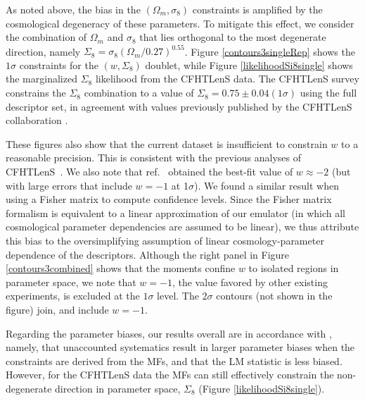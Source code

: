 \documentclass[reprint,aps,prd,superscriptaddress,showkeys,showpacs]{revtex4-1}
\begin{document}
As noted above, the bias in the $(\Omega_m,\sigma_8)$ constraints is
amplified by the cosmological degeneracy of these parameters. To
mitigate this effect, we consider the combination of $\Omega_m$ and
$\sigma_8$ that lies orthogonal to the most degenerate direction,
namely $\Sigma_8=\sigma_8(\Omega_m/0.27)^{0.55}$. Figure
\ref{contours3singleRep} shows the $1\sigma$ constraints for the
$(w,\Sigma_8)$ doublet, while Figure \ref{likelihoodSi8single} shows
the marginalized $\Sigma_8$ likelihood from the CFHTLenS data. The
CFHTLenS survey constrains the $\Sigma_8$ combination to a value of
$\Sigma_8=0.75\pm0.04(1\sigma)$ using the full descriptor set, in
agreement with values previously published by the CFHTLenS
collaboration \citep{CFHTKilbinger}. 

These figures also show that the current dataset is insufficient to
constrain $w$ to a reasonable precision.
This is consistent with the previous analyses of
CFHTLenS~\citep{CFHTKilbinger,CFHTFu,Companion,CFHTMasato}.  We also
note that ref.~\citep{CFHTMasato} obtained the best-fit value of
$w\approx -2$ (but with large errors that include $w=-1$ at
1$\sigma$).  We found a similar result when using a Fisher matrix to
compute confidence levels. Since the Fisher matrix formalism is equivalent to a linear approximation of our emulator (in which all cosmological parameter dependencies are assumed to be linear), we thus attribute this bias to the oversimplifying assumption of linear cosmology-parameter dependence of the descriptors.  
Although the right panel in Figure
\ref{contours3combined} shows that the moments confine $w$ to isolated
regions in parameter space, we note that $w=-1$, the value favored by other existing experiments, is excluded at the $1\sigma$
level. The $2\sigma$ contours (not shown in the figure) join, and
include $w=-1$.


Regarding the parameter biases, our results overall are in accordance
with \citep{PetriSpurious}, namely, that unaccounted systematics
result in larger parameter biases when the constraints are derived
from the MFs, and that the LM statistic is less biased. However, for
the CFHTLenS data the MFs can still effectively constrain the
non-degenerate direction in parameter space, $\Sigma_8$ (Figure
\ref{likelihoodSi8single}).
\end{document}
